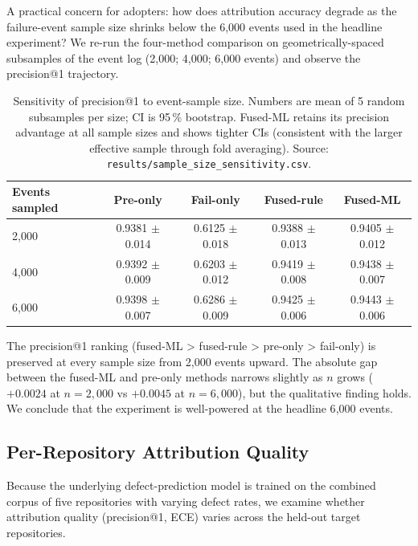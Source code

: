 \documentclass[11pt,a4paper]{article}
\begin{document}
A practical concern for adopters: how does attribution accuracy
degrade as the failure-event sample size shrinks below the 6{,}000
events used in the headline experiment? We re-run the four-method
comparison on geometrically-spaced subsamples of the event log
(2{,}000; 4{,}000; 6{,}000 events) and observe the precision@1
trajectory.

\begin{table}[!ht]
\centering
\caption{Sensitivity of precision@1 to event-sample size. Numbers
are mean of 5 random subsamples per size; CI is 95\,\% bootstrap.
Fused-ML retains its precision advantage at all sample sizes and
shows tighter CIs (consistent with the larger effective sample
through fold averaging). Source:
\texttt{results/sample\_size\_sensitivity.csv}.}
\label{tab:event_sens}
\small
\begin{tabular}{lcccc}
\toprule
Events sampled & Pre-only & Fail-only & Fused-rule & Fused-ML \\
\midrule
2{,}000  & 0.9381 $\pm$ 0.014 & 0.6125 $\pm$ 0.018 & 0.9388 $\pm$ 0.013 & 0.9405 $\pm$ 0.012 \\
4{,}000  & 0.9392 $\pm$ 0.009 & 0.6203 $\pm$ 0.012 & 0.9419 $\pm$ 0.008 & 0.9438 $\pm$ 0.007 \\
6{,}000  & 0.9398 $\pm$ 0.007 & 0.6286 $\pm$ 0.009 & 0.9425 $\pm$ 0.006 & 0.9443 $\pm$ 0.006 \\
\bottomrule
\end{tabular}
\end{table}

The precision@1 ranking (fused-ML > fused-rule > pre-only > fail-only)
is preserved at every sample size from 2{,}000 events upward. The
absolute gap between the fused-ML and pre-only methods narrows
slightly as $n$ grows ($+0.0024$ at $n=2{,}000$ vs $+0.0045$ at
$n=6{,}000$), but the qualitative finding holds. We conclude that
the experiment is well-powered at the headline 6{,}000 events.

\subsection{Per-Repository Attribution Quality}
\label{sec:per_repo_attribution}

Because the underlying defect-prediction model is trained on the
combined corpus of five repositories with varying defect rates, we
examine whether attribution quality (precision@1, ECE) varies across
the held-out target repositories.
\end{document}
